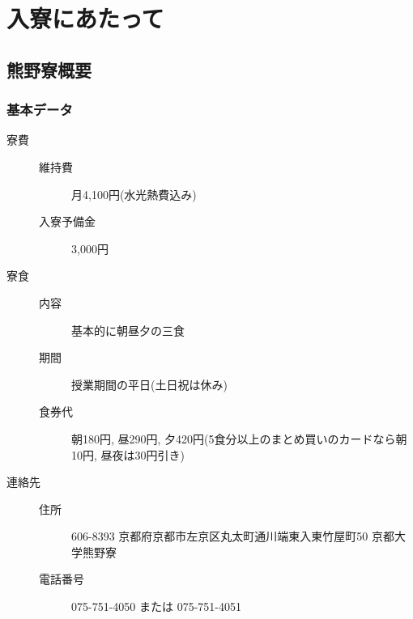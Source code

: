 \documentclass[10pt,b5jsbook,dvips,dvipdfmx,openany]{jsbook}
\theoremstyle{definition}
\begin{document}
   
\setcounter{page}{1}
  \setcounter{tocdepth}{1}
  \tableofcontents

    \thispagestyle{empty}

  \newpage
 

\chapter{入寮にあたって}
	\section{熊野寮概要} \label{sec:abst}

		\subsection{基本データ} \label{subsec:data}
		\begin{description} 
		\item[寮費] \hspace{10mm}
			\begin{description}
			\item[維持費] 月4,100円(水光熱費込み)
			\item[入寮予備金] 3,000円
			\end{description}
		\item[寮食] \hspace{10mm} 
			\begin{description}
			\item[内容] 基本的に朝昼夕の三食
			\item[期間] 授業期間の平日(土日祝は休み)
			\item[食券代] 朝180円, 昼290円, 夕420円(5食分以上のまとめ買いのカードなら朝10円, 昼夜は30円引き)
			\end{description}
		\item[連絡先] \hspace{10mm} 
			\begin{description}
			\item[住所]606-8393 京都府京都市左京区丸太町通川端東入東竹屋町50 京都大学熊野寮
			\item[電話番号] 075-751-4050 または 075-751-4051
			\end{description}
		\end{description}
\end{document}
